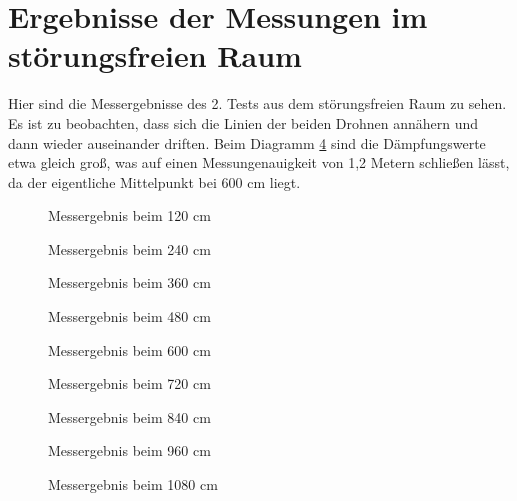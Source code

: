 \documentclass[a4paper]{spie}  %
\begin{document}
\section{Ergebnisse der Messungen im störungsfreien Raum}\label{testAnhang}
Hier sind die Messergebnisse des 2. Tests aus dem störungsfreien Raum zu sehen. Es ist zu beobachten, dass sich die Linien der beiden Drohnen annähern und dann wieder auseinander driften. Beim Diagramm \ref{fig:480} sind die Dämpfungswerte etwa gleich groß, was auf einen Messungenauigkeit von 1,2 Metern schließen lässt, da der eigentliche Mittelpunkt bei 600 cm liegt.

\begin{figure}[H]
	\centering
		\caption{Messergebnis beim 120 cm}
		\label{fig:120}
\end{figure}

\begin{figure}[H]
	\centering
		\caption{Messergebnis beim 240 cm}
		\label{fig:240}
\end{figure}

\begin{figure}[H]
	\centering
		\caption{Messergebnis beim 360 cm}
		\label{fig:360}
\end{figure}

\begin{figure}[H]
	\centering
		\caption{Messergebnis beim 480 cm}
		\label{fig:480}
\end{figure}

\begin{figure}[H]
	\centering
		\caption{Messergebnis beim 600 cm}
		\label{fig:600}
\end{figure}

\begin{figure}[H]
	\centering
		\caption{Messergebnis beim 720 cm}
		\label{fig:720}
\end{figure}

\begin{figure}[H]
	\centering
		\caption{Messergebnis beim 840 cm}
		\label{fig:840}
\end{figure}

\begin{figure}[H]
	\centering
		\caption{Messergebnis beim 960 cm}
		\label{fig:960}
\end{figure}

\begin{figure}[H]
	\centering
		\caption{Messergebnis beim 1080 cm}
		\label{fig:1080}
\end{figure}
\end{document}
